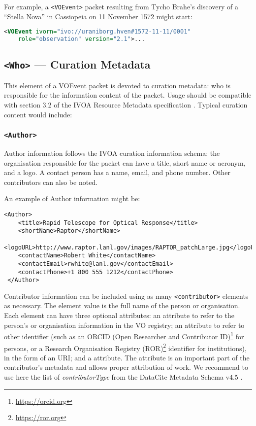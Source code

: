 \documentclass[11pt,a4paper]{ivoa}
\begin{document}
For example, a \verb|<VOEvent>| packet resulting from Tycho Brahe's discovery of
a ``Stella Nova'' in Cassiopeia on 11 November 1572 might start:
\begin{lstlisting}[language=XML]
<VOEvent ivorn="ivo://uraniborg.hven#1572-11-11/0001"
    role="observation" version="2.1">...
\end{lstlisting}

\subsection{\texttt{<Who>} --- Curation Metadata}
\label{sec:3.2}
This element of a VOEvent packet is devoted to curation metadata: who is
responsible for the information content of the packet. Usage should be
compatible with section 3.2 of the IVOA Resource Metadata specification
\citep{2007ivoa.spec.0302H}. Typical curation content would include:

\subsubsection{\texttt{<Author>}}
Author information follows the IVOA curation information schema: the
organisation responsible for the packet can have a title, short name or acronym,
and a logo. A contact person has a name, email, and phone number. Other
contributors can also be noted.

An example of Author information might be:
\begin{lstlisting}
<Author>
    <title>Rapid Telescope for Optical Response</title>
    <shortName>Raptor</shortName>
    <logoURL>http://www.raptor.lanl.gov/images/RAPTOR_patchLarge.jpg</logoURL>
    <contactName>Robert White</contactName>
    <contactEmail>rwhite@lanl.gov</contactEmail>
    <contactPhone>+1 800 555 1212</contactPhone>
 </Author>
\end{lstlisting}

Contributor information can be included using as many \verb|<contributor>|
elements as necessary. The element value is the full name of the person or
organisation. Each element can have three optional attributes: an 
attribute to refer to the person's or organisation information in the VO
registry; an  attribute to refer to other identifier (such
as an ORCID (Open Researcher and Contributor ID)\footnote{\url{https://orcid.org}}
for persons, or a Research Organisation Registry
(ROR)\footnote{\url{https://ror.org}} identifier for institutions), in the form
of an URI; and a  attribute. The  attribute is an important
part of the contributor's metadata and allows proper attribution of work. We
recommend to use here the list of \emph{contributorType} from the DataCite
Metadata Schema v4.5 \citep{https://doi.org/10.14454/g8e5-6293}.
\end{document}
